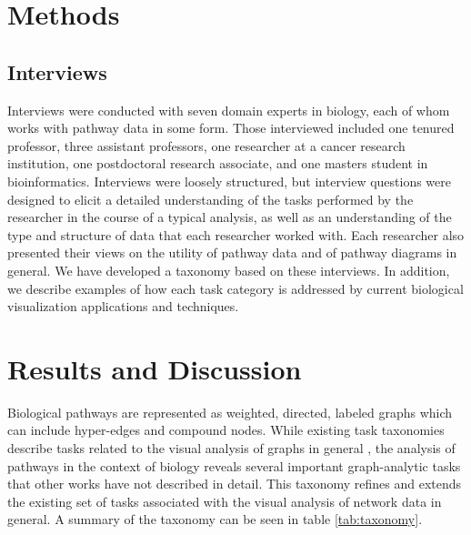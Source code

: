 \section*{Methods}

\subsection*{Interviews}

Interviews were conducted with seven domain experts in biology, each of whom works with pathway data in some form.
Those interviewed included one tenured professor, three assistant professors, one researcher at a cancer research institution, one postdoctoral research associate, and one masters student in bioinformatics.
Interviews were loosely structured, but interview questions were designed to elicit a detailed understanding of the tasks performed by the researcher in the course of a typical analysis, as well as an understanding of the type and structure of data that each researcher worked with.
Each researcher also presented their views on the utility of pathway data and of pathway diagrams in general.
We have developed a taxonomy based on these interviews.
In addition, we describe examples of how each task category is addressed by current biological visualization applications and techniques.

\section*{Results and Discussion}

Biological pathways are represented as weighted, directed, labeled graphs which can include hyper-edges and compound nodes.
While existing task taxonomies describe tasks related to the visual analysis of graphs in general \cite{Ahn2014, Pretorius2014}, the analysis of pathways in the context of biology reveals several important graph-analytic tasks that other works have not described in detail.
This taxonomy refines and extends the existing set of tasks associated with the visual analysis of network data in general.
A summary of the taxonomy can be seen in table \ref{tab:taxonomy}.

